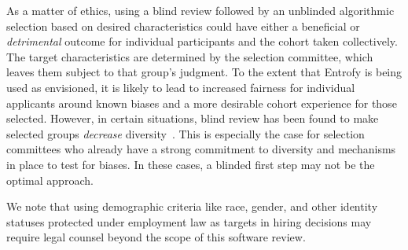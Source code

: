 \documentclass[12pt]{article}
\begin{document}
\begin{bf}
As a matter of ethics, using a blind review followed by an unblinded algorithmic selection based on desired characteristics could have either a beneficial or \emph{detrimental} outcome for individual participants and the cohort taken collectively.
The target characteristics are determined by the selection committee, which leaves them subject to that group's judgment.
To the extent that Entrofy is being used as envisioned, it is likely to lead to increased fairness for individual applicants around known biases and a more desirable cohort experience for those selected.
However, in certain situations, blind review has been found to make selected groups \textit{decrease} diversity~\cite{behaghel2015unintended}.
This is especially the case for selection committees who already have a strong commitment to diversity and mechanisms in place to test for biases.
In these cases, a blinded first step may not be the optimal approach.
\end{bf}
We note that using demographic criteria like race, gender, and other identity statuses protected under employment law as targets in hiring decisions may require legal counsel beyond the scope of this software review.
\end{document}
